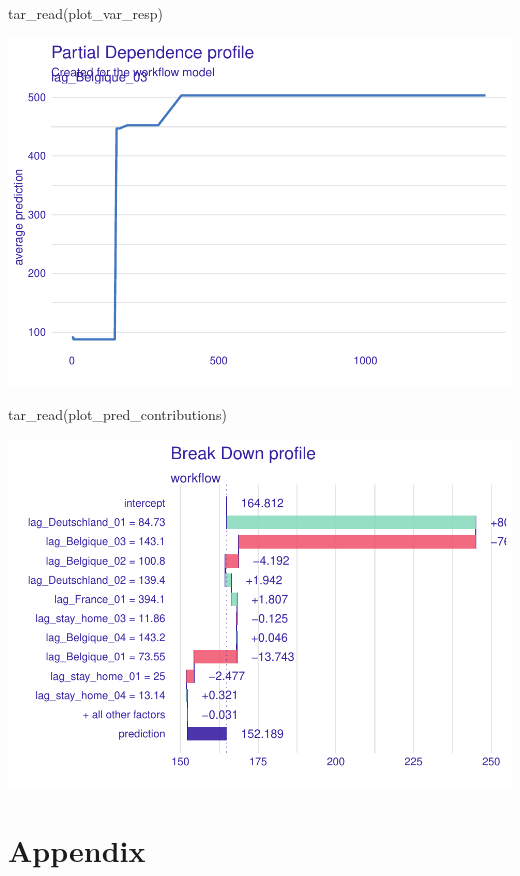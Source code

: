 \documentclass{article}
\newenvironment{Shaded}{\begin{snugshade}}{\end{snugshade}}
\newcommand{\FunctionTok}[1]{\textcolor[rgb]{0.00,0.00,0.00}{#1}}
\newcommand{\NormalTok}[1]{#1}
\begin{document}
\begin{Shaded}
\begin{Highlighting}[]
\FunctionTok{tar\_read}\NormalTok{(plot\_var\_resp)}
\end{Highlighting}
\end{Shaded}

\includegraphics{paper_files/figure-latex/unnamed-chunk-8-1.pdf}

\begin{Shaded}
\begin{Highlighting}[]
\FunctionTok{tar\_read}\NormalTok{(plot\_pred\_contributions)}
\end{Highlighting}
\end{Shaded}

\includegraphics{paper_files/figure-latex/unnamed-chunk-9-1.pdf}

\hypertarget{appendix}{%
\section{Appendix}\label{appendix}}



\end{document}
